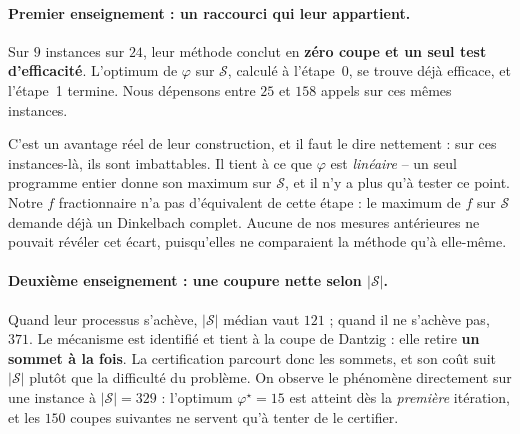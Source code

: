 \documentclass[11pt,a4paper]{article}
\theoremstyle{plain}
\theoremstyle{remark}
\newcommand{\Scal}{\mathcal{S}}
\begin{document}
\paragraph{Premier enseignement : un raccourci qui leur appartient.} Sur
$9$ instances sur $24$, leur méthode conclut en \textbf{zéro coupe et un
seul test d'efficacité}. L'optimum de $\varphi$ sur $\Scal$, calculé à
l'étape~0, se trouve déjà efficace, et l'étape~1 termine. Nous dépensons
entre $25$ et $158$ appels sur ces mêmes instances.

C'est un avantage réel de leur construction, et il faut le dire nettement :
sur ces instances-là, ils sont imbattables. Il tient à ce que $\varphi$ est
\emph{linéaire} -- un seul programme entier donne son maximum sur $\Scal$,
et il n'y a plus qu'à tester ce point. Notre $f$ fractionnaire n'a pas
d'équivalent de cette étape : le maximum de $f$ sur $\Scal$ demande déjà un
Dinkelbach complet. Aucune de nos mesures antérieures ne pouvait révéler cet
écart, puisqu'elles ne comparaient la méthode qu'à elle-même.

\paragraph{Deuxième enseignement : une coupure nette selon $|\Scal|$.}
Quand leur processus s'achève, $|\Scal|$ médian vaut $121$ ; quand il ne
s'achève pas, $371$. Le mécanisme est identifié et tient à la coupe de
Dantzig : elle retire \textbf{un sommet à la fois}. La certification
parcourt donc les sommets, et son coût suit $|\Scal|$ plutôt que la
difficulté du problème. On observe le phénomène directement sur une instance
à $|\Scal|=329$ : l'optimum $\varphi^\star=15$ est atteint dès la
\emph{première} itération, et les $150$ coupes suivantes ne servent qu'à
tenter de le certifier.
\end{document}
